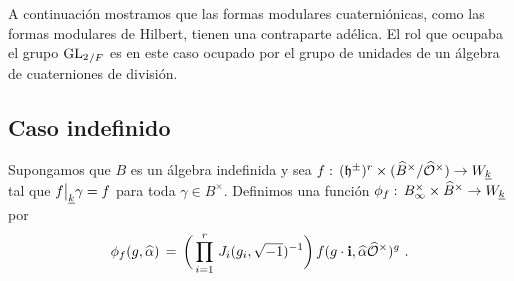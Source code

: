 A continuaci\'{o}n mostramos que las formas modulares cuaterni\'{o}nicas, como
las formas modulares de Hilbert, tienen una contraparte ad\'{e}lica. El rol que
ocupaba el grupo ${\mathrm{GL}_{2}}_{/F}$ es en este caso ocupado por el grupo de
unidades de un \'{a}lgebra de cuaterniones de divisi\'{o}n.

\subsection{Caso indefinido}
Supongamos que $B$ es un \'{a}lgebra indefinida y sea
\begin{math}
	f :\,(\mathfrak{h}^{\pm})^{r}\times(\widehat{B}^{\times}/\widehat{\mathcal{O}}^{\times})\rightarrow
		W_{\underline{k}}
\end{math} tal que $f\big|_{\underline{k}}{\gamma}=f$ para toda
$\gamma\in B^{\times}$. Definimos una funci\'{o}n
\begin{math}
	\phi_{f} :\,{B}_{\infty}^{\times}\times\widehat{B}^{\times}\rightarrow W_{\underline{k}}
\end{math}
por
\begin{equation}
	\label{eq:funcionadelicacorrespondienteindefinida}
	\phi_{f}(g,\widehat{\alpha}) \,=\,
		\bigg(\prod_{i=1}^{r}\,J_{i}(g_{i},\sqrt{-1})^{-1}\bigg)\,
		f(g\cdot\mathbf{i},\widehat{\alpha}\widehat{\mathcal{O}}^{\times})^{g}
	\text{ .}
\end{equation}
%

